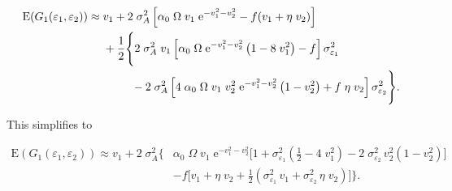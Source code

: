 \begin{equation*}
\begin{split}
    \text{E}(G_1(\varepsilon_1, \varepsilon_2)) \approx \; &
        v_1 + 2 \; \sigma_A^2 \left[ 
            \alpha_0 \; \Omega \; v_1 \; \text{e}^{-v_1^2 - v_2^2} - f (v_1 + \eta \; v_2)
        \right] \\
        &+ \frac{1}{2} \Bigg\{
            2 \; \sigma_A^2 \; v_1 \left[
                \alpha_0 \; \Omega \; \text{e}^{-v_1^2 - v_2^2} \left( 1 - 8 \; v_1^2 \right) - f
            \right] \sigma^2_{\varepsilon_1} \\
            & \hspace{2.5em} - 2 \; \sigma_A^2 \left[
                4 \; \alpha_0 \; \Omega \; v_1 \; v_2^2 \; \text{e}^{-v_1^2 - v_2^2} \left( 1 - v_2^2 \right) + f \; \eta \; v_2
            \right] \sigma^2_{\varepsilon_2}
        \Bigg\} %
%
%
%
%
\text{.}
\end{split}
\end{equation*}

This simplifies to 

\begin{equation}
\label{eq:taylor-expansion-final-supp}
\begin{split}
    \text{E}(G_1(\varepsilon_1, \varepsilon_2)) \approx
        v_1 + 2 \; \sigma_A^2 \Bigg\{ 
            & \alpha_0 \; \Omega \; v_1 \; \text{e}^{-v_1^2 - v_2^2} 
            \bigg[ 
                1 + \sigma^2_{\varepsilon_1} \left( \frac{1}{2} - 4 \; v_1^2 \right)
                - 2 \; \sigma^2_{\varepsilon_2} \, v_2^2 \left( 1 - v_2^2 \right)
            \bigg] \\
            & - f \bigg[
                v_1 + \eta \; v_2 + \frac{1}{2} \left(
                    \sigma^2_{\varepsilon_1} \, v_1 + \sigma^2_{\varepsilon_2} \, \eta \; v_2
                \right)
            \bigg]
        \Bigg\}
\text{.}
\end{split}
\end{equation}








